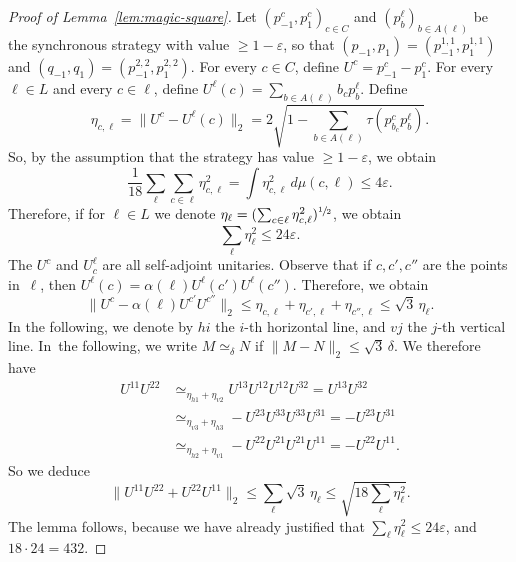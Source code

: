 \documentclass[JEP,XML,SOM,Unicode,published]{cedram}
\let\ts\textstyle
\theoremstyle{plain}
\theoremstyle{definition}
\begin{document}
\begin{proof}[Proof of Lemma~\ref{lem:magic-square}]
Let $(p^c_{-1},p^c_1)_{c \in C}$ and $(p^\ell_b)_{b \in A(\ell)}$ be the synchronous strategy with value $\geq 1-\varepsilon$, so that $(p_{-1},p_1) =(p^{1,1}_{-1},p^{1,1}_1)$ and $(q_{-1},q_1) =(p^{2,2}_{-1},p^{2,2}_1)$. For every $c \in C$, define $U^{c} = p^{c}_{-1}-p^c_1$. For every $\ell \in L$ and every $c\in \ell$, define $U^\ell(c) = \sum_{b \in A(\ell)} b_c p^\ell_b$. Define
\[\ts
\eta_{c,\ell} = \|U^c - U^\ell(c)\|_2 = 2\sqrt{ 1-\sum_{b \in A(\ell)} \tau(p^c_{b_c} p^\ell_b)}.
\]
So, by the assumption that the strategy has value $\geq 1-\varepsilon$, we obtain
\[
\frac{1}{18} \sum_{\ell} \sum_{c \in \ell} \eta_{c,\ell}^2 =\int \eta_{c,\ell}^2 \,d\mu(c,\ell) \leq 4\varepsilon.
\]
Therefore, if for $\ell \in L$ we denote $\eta_\ell = (\sum_{c \in \ell} \eta_{c,\ell}^2)^{\sfrac 1 2}$, we obtain
\[
\sum_\ell \eta_\ell^2 \leq 24 \varepsilon.
\]
The $U^c$ and $U^\ell_c$ are all self-adjoint unitaries. Observe that if $c,c',c''$ are the points in~$\ell$, then $U^\ell(c) = \alpha(\ell) U^{\ell}(c') U^{\ell}(c'')$. Therefore, we obtain
\[
\|U^c - \alpha(\ell) U^{c'} U^{c''}\|_2 \leq \eta_{c,\ell} + \eta_{c',\ell} +\eta_{c'',\ell} \leq \sqrt{3}\,\eta_\ell.
\]
In the following, we denote by $hi$ the $i$-th horizontal line, and $vj$ the $j$-th vertical line. In~the following, we write $M\simeq_\delta N$ if $\|M-N\|_2 \leq \sqrt{3}\,\delta$. We therefore have
\begin{align*} U^{11}U^{22} &\simeq_{\eta_{h1}+\eta_{v2}} U^{13}U^{12} U^{12}U^{32} = U^{13}U^{32}\\
& \simeq_{\eta_{v3}+\eta_{h3}} -U^{23}U^{33}U^{33}U^{31} = -U^{23}U^{31}\\
& \simeq_{\eta_{h2}+\eta_{v1}} - U^{22}U^{21} U^{21}U^{11} = - U^{22}U^{11}.
\end{align*}
So we deduce
\[\ts
\|U^{11}U^{22} + U^{22}U^{11}\|_2 \leq \sum_\ell \sqrt{3}\, \eta_\ell \leq \sqrt{18 \sum_{\ell} \eta_\ell^2} .
\]
The lemma follows, because we have already justified that $\sum_\ell \eta_\ell^2 \leq 24 \varepsilon$, and $18 \cdot 24 = 432$.
\end{proof}
\end{document}
